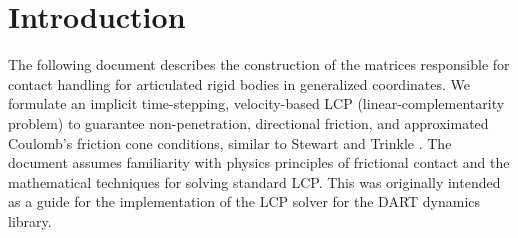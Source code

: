\section{Introduction}
The following document describes the construction of the matrices responsible for contact handling for articulated rigid bodies in generalized coordinates. We formulate an implicit time-stepping, velocity-based LCP (linear-complementarity problem) to guarantee non-penetration, directional friction, and approximated Coulomb’s friction cone conditions, similar to Stewart and Trinkle \cite{Stewart:1996}. The document assumes familiarity with physics principles of frictional contact and the mathematical techniques for solving standard LCP. This was originally intended as a guide for the implementation of the LCP solver for the DART dynamics library.
